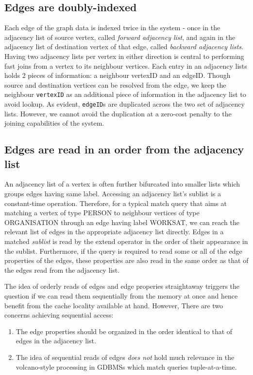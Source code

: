\subsection{Edges are doubly-indexed}
Each edge of the graph data is indexed twice in the system - once in the adjacency list of source vertex, called \emph{forward adjacency list}, and again in the adjacency list of destination vertex of that edge, called \emph{backward adjacency lists}. Having two adjacency lists per vertex in either direction is central to performing fast joins from a vertex to its neighbour vertices. Each entry in an adjacency lists holds 2 pieces of information: a neighbour vertexID and an edgeID. Though source and destination vertices can be resolved from the edge, we keep the neighbour \texttt{vertexID} as an additional piece of information in the adjacency list to avoid lookup. As evident, \texttt{edgeID}s are duplicated across the two set of adjacency lists. However, we cannot avoid the duplication at a zero-cost penalty to the joining capabilities of the system.

\subsection{Edges are read in an order from the adjacency list}
An adjacency list of a vertex is often further bifurcated into smaller lists which groups edges having same label. Accessing an adjacency list's sublist is a constant-time operation. Therefore, for a typical match query that aims at matching a vertex of type PERSON to neighbour vertices of type ORGANISATION through an edge having label WORKSAT, we can reach the relevant list of edges in the appropriate adjacency list directly. Edges in a matched \emph{sublist} is read by the extend operator in the order of their appearance in the sublist. Furthermore, if the query is required to read some or all of the edge properties of the edges, these properties are also read in the same order as that of the edges read from the adjacency list. 

The idea of orderly reads of edges and edge properies straightaway triggers the question if we can read them sequentially from the memory at once and hence benefit from the cache locality available at hand. However, There are two concerns achieving sequential access: 
\begin{enumerate}
	\item The edge properties should be organized in the order identical to that of edges in the adjacency list.
	\item The idea of sequential reads of edges \emph{does not} hold much relevance in the volcano-style processing in GDBMSs which match queries tuple-at-a-time.
\end{enumerate}


